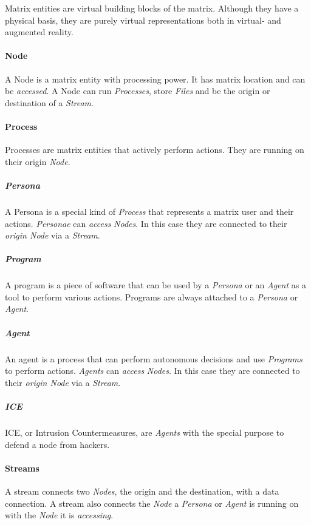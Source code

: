 Matrix entities are virtual building blocks of the matrix. Although they have a
physical basis, they are purely virtual representations both in virtual- and
augmented reality.

\paragraph{Node}
\label{par:node}

A Node is a matrix entity with processing power. It has matrix location and can be
\emph{accessed}. A Node can run \emph{Processes}, store \emph{Files} and be the
origin or destination of a \emph{Stream}.

\paragraph{Process}
\label{par:process}

Processes are matrix entities that actively perform actions. They are running on
their origin \emph{Node}.

\subparagraph{Persona}
A Persona is a special kind of \emph{Process} that represents a matrix user and
their actions. \emph{Personae} can \emph{access} \emph{Nodes}. In this case they
are connected to their \emph{origin Node} via a \emph{Stream}.

\subparagraph{Program}
A program is a piece of software that can be used by a \emph{Persona} or an
\emph{Agent} as a tool to perform various actions. Programs are always attached
to a \emph{Persona} or \emph{Agent}.

\subparagraph{Agent}
An agent is a process that can perform autonomous decisions and use \emph{Programs}
to perform actions. \emph{Agents} can \emph{access} \emph{Nodes}. In this case they are
connected to their \emph{origin Node} via a \emph{Stream}.

\subparagraph{ICE}
ICE, or Intrusion Countermeasures, are \emph{Agents} with the special purpose to
defend a node from hackers.

\paragraph{Streams}
\label{par:stream}

A stream connects two \emph{Nodes}, the origin and the destination, with a data
connection. A stream also connects the \emph{Node} a \emph{Persona} or \emph{Agent}
is running on with the \emph{Node} it is \emph{accessing}.

